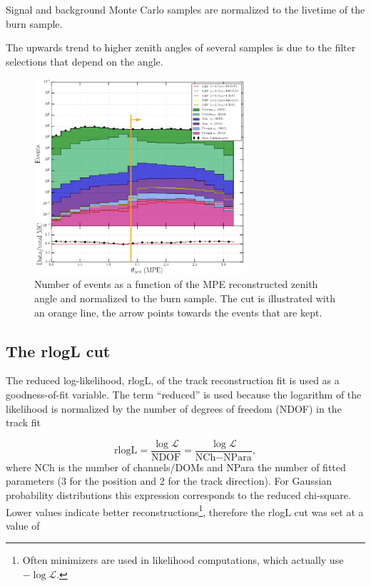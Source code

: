 Signal and background Monte Carlo samples are normalized to the livetime of the burn sample.

The upwards trend to higher zenith angles of several samples is due to the filter selections that depend on the angle. 

\begin{figure}[t]
\centering
\includegraphics[width=0.7\textwidth]{chapter8/img/1D_stack_mpefit_zenith_new.png}
\caption{Number of events as a function of the MPE reconstructed zenith angle and normalized to the burn sample. The cut is illustrated with an orange line, the arrow points towards the events that are kept.}
\label{fig:level3cutszenith}
\end{figure}


\subsection{The rlogL cut}
The reduced log-likelihood, rlogL, of the track reconstruction fit is used as a goodness-of-fit variable. The term ``reduced'' is used because the logarithm of the likelihood is normalized by the number of degrees of freedom (NDOF) in the track fit

\begin{equation}
\textrm{rlogL} = \frac{\log \mathcal{L}}{\textrm{NDOF}} = \frac{\log \mathcal{L}}{\textrm{NCh} - \textrm{NPara}},
\end{equation}
where NCh is the number of channels/DOMs and NPara the number of fitted parameters (3 for the position and 2 for the track direction). For Gaussian probability distributions this expression corresponds to the reduced chi-square. Lower values indicate better reconstructions\footnote{Often minimizers are used in likelihood computations, which actually use $-\log \mathcal{L}$.}, therefore the rlogL cut was set at a value of 

